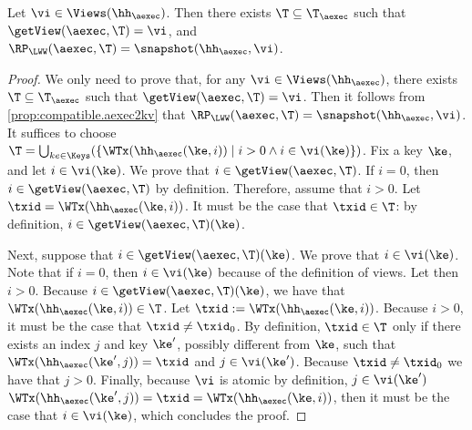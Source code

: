 \begin{proposition}
\label{prop:compatible.kv2aexec}
Let $\vi \in \Views(\hh_{\aexec})$. Then there exists $\T \subseteq \T_{\aexec}$ 
such that $\getView(\aexec, \T) = \vi$, and $\RP_{\LWW}(\aexec, \T) = \snapshot(\hh_{\aexec}, \vi)$.
\end{proposition}

\begin{proof}
We only need to prove that, for any $\vi \in \Views(\hh_{\aexec})$, there exists $\T \subseteq \T_{\aexec}$ such 
that $\getView(\aexec, \T) = \vi$. Then it follows from \cref{prop:compatible.aexec2kv} that 
$\RP_{\LWW}(\aexec, \T) = \snapshot(\hh_{\aexec}, \vi)$. It suffices to choose $\T = \bigcup_{ke \in \Keys}(\{ \WTx(\hh_{\aexec}(\ke, i)) \mid i > 0 
\wedge i \in \vi(\ke)\})$.
Fix a key $\ke$, and let $i \in \vi(\ke)$. We prove that $i \in \getView(\aexec, \T)$. 
If $i = 0$, then $i \in \getView(\aexec, \T)$ by definition. 
Therefore, assume that $i > 0$. Let $\txid = \WTx(\hh_{\aexec}(\ke, i))$. It must be the case that $\txid \in \T$: by 
definition, $i \in \getView(\aexec, \T)(\ke)$.

Next, suppose that $i \in \getView(\aexec, \T)(\ke)$. We prove that $i \in \vi(\ke)$.
Note that if $i = 0$, then $i \in \vi(\ke)$ because of the 
definition of views. Let then $i > 0$. Because $i \in \getView(\aexec, \T)(\ke)$, we have that 
$\WTx(\hh_{\aexec}(\ke, i)) \in \T$.  Let $\txid := \WTx(\hh_{\aexec}(\ke, i))$. Because $i > 0$, 
it must be the case that $\txid \neq \txid_0$.
By definition, $\txid \in \T$ only if there 
exists an index $j$ and key $\ke'$, possibly different from $\ke$, such that $\WTx(\hh_{\aexec}(\ke', j)) = \txid$ and $j \in \vi(\ke')$. 
Because $\txid \neq \txid_0$ we have that $j > 0$. Finally, because $\vi$ is atomic by definition, $j \in \vi(\ke')$
$\WTx(\hh_{\aexec}(\ke', j)) = \txid = \WTx(\hh_{\aexec}(\ke, i))$, then it must be the case 
that $i \in \vi(\ke)$, which concludes the proof.
\end{proof}